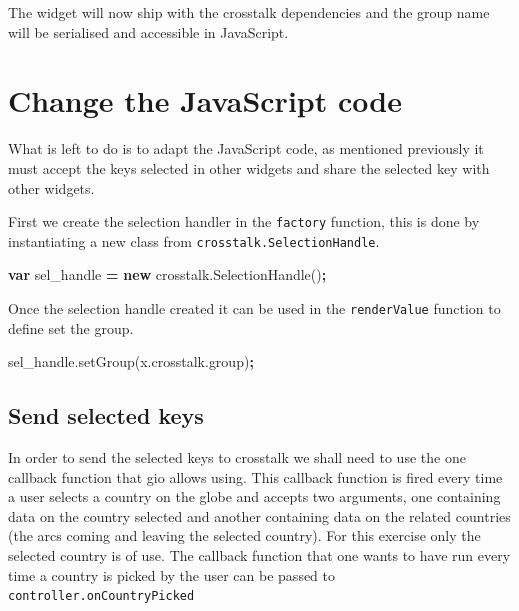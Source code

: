 \documentclass[
]{krantz}
\makeatletter
\newenvironment{Shaded}{\begin{snugshade}}{\end{snugshade}}
\newcommand{\AttributeTok}[1]{\textcolor[rgb]{0.61,0.61,0.61}{#1}}
\newcommand{\KeywordTok}[1]{\textcolor[rgb]{0.27,0.27,0.27}{\textbf{#1}}}
\newcommand{\NormalTok}[1]{#1}
\newcommand{\OperatorTok}[1]{\textcolor[rgb]{0.43,0.43,0.43}{\textbf{#1}}}
\newcommand{\VariableTok}[1]{\textcolor[rgb]{0,0,0}{#1}}
\newenvironment{kframe}{%
\medskip{}
\setlength{\fboxsep}{.8em}
 \def\at@end@of@kframe{}%
 \ifinner\ifhmode%
  \def\at@end@of@kframe{\end{minipage}}%
  \begin{minipage}{\columnwidth}%
 \fi\fi%
 \def\FrameCommand##1{\hskip\@totalleftmargin \hskip-\fboxsep
 \colorbox{shadecolor}{##1}\hskip-\fboxsep
     \hskip-\linewidth \hskip-\@totalleftmargin \hskip\columnwidth}%
 \MakeFramed {\advance\hsize-\width
   \@totalleftmargin\z@ \linewidth\hsize
   \@setminipage}}%
 {\par\unskip\endMakeFramed%
 \at@end@of@kframe}
\renewenvironment{Shaded}{\begin{kframe}}{\end{kframe}}
\makeatother
\begin{document}
The widget will now ship with the crosstalk dependencies and the group name will be serialised and accessible in JavaScript.

\hypertarget{change-the-javascript-code}{%
\section{Change the JavaScript code}\label{change-the-javascript-code}}

What is left to do is to adapt the JavaScript code, as mentioned previously it must accept the keys selected in other widgets and share the selected key with other widgets.

First we create the selection handler in the \texttt{factory} function, this is done by instantiating a new class from \texttt{crosstalk.SelectionHandle}.

\begin{Shaded}
\begin{Highlighting}[]
\KeywordTok{var}\NormalTok{ sel\_handle }\OperatorTok{=} \KeywordTok{new} \VariableTok{crosstalk}\NormalTok{.}\AttributeTok{SelectionHandle}\NormalTok{()}\OperatorTok{;}
\end{Highlighting}
\end{Shaded}

Once the selection handle created it can be used in the \texttt{renderValue} function to define set the group.

\begin{Shaded}
\begin{Highlighting}[]
\VariableTok{sel\_handle}\NormalTok{.}\AttributeTok{setGroup}\NormalTok{(}\VariableTok{x}\NormalTok{.}\VariableTok{crosstalk}\NormalTok{.}\AttributeTok{group}\NormalTok{)}\OperatorTok{;}
\end{Highlighting}
\end{Shaded}

\hypertarget{send-selected-keys}{%
\subsection{Send selected keys}\label{send-selected-keys}}

In order to send the selected keys to crosstalk we shall need to use the one callback function that gio allows using. This callback function is fired every time a user selects a country on the globe and accepts two arguments, one containing data on the country selected and another containing data on the related countries (the arcs coming and leaving the selected country). For this exercise only the selected country is of use. The callback function that one wants to have run every time a country is picked by the user can be passed to \texttt{controller.onCountryPicked}
\end{document}
